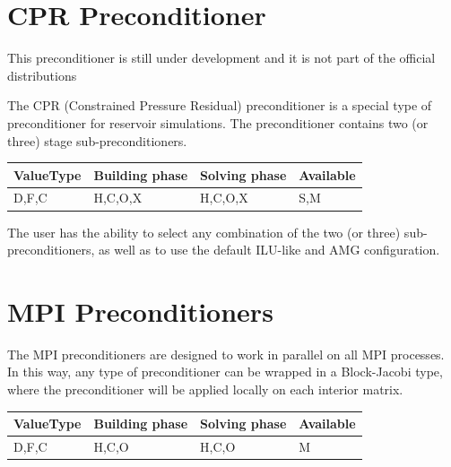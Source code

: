\section{CPR Preconditioner}

\begin{flushright}
{\color{red} This preconditioner is still under development and it is not part of the official distributions}
\end{flushright}

The CPR (Constrained Pressure Residual) preconditioner is a special type of preconditioner for reservoir simulations. The preconditioner contains two (or three) stage sub-preconditioners. 

\begin{table}[H]
\begin{tabular}{l|l|l|l}
\multicolumn{1}{c|}{ValueType} & Building phase & Solving phase & Available \\ \hline
D,F,C                          & H,C,O,X        & H,C,O,X       & S,M      
\end{tabular}
\end{table}

The user has the ability to select any combination of the two (or three) sub-preconditioners, as well as to use the default ILU-like and AMG configuration.


\section{MPI Preconditioners}

The MPI preconditioners are designed to work in parallel on all MPI processes. In this way, any type of preconditioner can be wrapped in a Block-Jacobi type, where the preconditioner will be applied locally on each interior matrix.

\begin{table}[H]
\begin{tabular}{l|l|l|l}
\multicolumn{1}{c|}{ValueType} & Building phase & Solving phase & Available \\ \hline
D,F,C                          & H,C,O          & H,C,O         & M      
\end{tabular}
\end{table}




